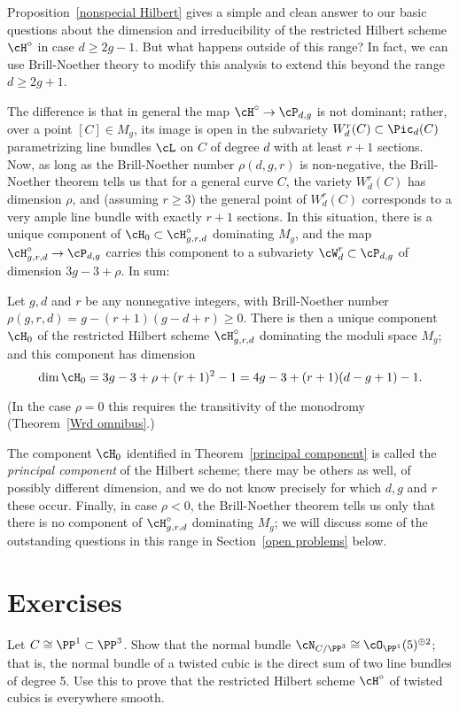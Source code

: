 Proposition~\ref{nonspecial Hilbert} gives a simple and clean answer to our basic questions about the dimension and irreducibility of the restricted Hilbert scheme $\cH^\circ$ in case $d \geq 2g-1$. But what happens outside of this range? In fact, we  can use Brill-Noether theory to modify this analysis to extend this beyond the range $d \geq 2g+1$.

The difference is that in general the map $\cH^\circ \to \cP_{d,g}$ is not dominant; rather, over a point $[C] \in M_g$, its image is open in the subvariety $W^r_d(C) \subset \Pic_d(C)$ parametrizing line bundles $\cL$ on $C$ of degree $d$ with at least $r+1$ sections. Now, as long as the Brill-Noether number $\rho(d,g,r)$ is non-negative, the Brill-Noether theorem tells us that for a general curve $C$, the variety $W^r_d(C)$ has dimension $\rho$, and (assuming $r \geq 3$) the general point of $W^r_d(C)$ corresponds to a very ample line bundle with exactly $r+1$ sections. In this situation, there is a unique component of $\cH_0 \subset \cH^\circ_{g,r,d}$ dominating $M_g$, and the map $\cH^\circ_{g,r,d} \to \cP_{d,g}$ carries this component to a subvariety $\cW^r_d \subset \cP_{d,g}$ of dimension $3g-3 + \rho$. In sum:

\begin{theorem}\label{principal component}
Let $g, d$ and $r$ be any nonnegative integers, with Brill-Noether number  $\rho(g,r,d) = g - (r+1)(g-d+r) \geq 0$. There is then a unique component $\cH_0$ of the restricted Hilbert scheme $\cH^\circ_{g,r,d}$ dominating the moduli space $M_g$; and this component has dimension
$$
\dim \cH_0 = 3g-3+\rho + (r+1)^2 - 1 = 4g-3 + (r+1)(d-g+1) - 1.
$$
\end{theorem}

(In the case $\rho=0$ this requires the transitivity of the monodromy (Theorem~\ref{Wrd omnibus}.) 


 The component $\cH_0$ identified in Theorem~\ref{principal component} is called the \emph{principal component} of the Hilbert scheme; there may be others as well, of possibly different dimension, and we do not know precisely for which $d,g$ and $r$ these occur. Finally, in case $\rho < 0$, the Brill-Noether theorem tells us only that there is no component of $\cH^\circ_{g,r,d}$ dominating $M_g$; we will discuss some of the outstanding questions in this range in Section~\ref{open problems} below. 



\section{Exercises}
\begin{exercise}\label{twisted cubic normal bundle}
Let $C \cong \PP^1 \subset \PP^3$. Show that the normal bundle $\cN_{C/\PP^3} \cong \cO_{\PP^1}(5)^{\oplus 2}$; that is, the normal bundle of a twisted cubic is the direct sum of two line bundles of degree 5. Use this to prove that the restricted Hilbert scheme $\cH^\circ$ of twisted cubics is everywhere smooth. \end{exercise}


